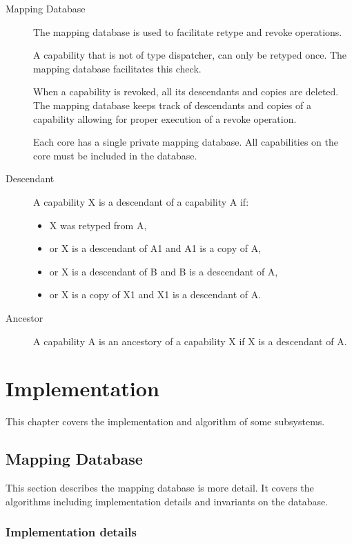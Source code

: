 \documentclass[a4paper,11pt,twoside]{report}
\begin{document}
\begin{description}
\item[Mapping Database] The mapping database is used to facilitate
  retype and revoke operations.

  A capability that is not of type dispatcher, can only be retyped once.
  The mapping database facilitates this check.

  When a capability is revoked, all its descendants and copies are deleted.
  The mapping database keeps track of descendants and copies of a capability
  allowing for proper execution of a revoke operation.

  Each core has a single private mapping database.
  All capabilities on the core must be included in the database.

\item[Descendant] A capability X is a descendant of a capability A if:

\begin{itemize}
  \item X was retyped from A,
  \item or X is a descendant of A1 and A1 is a copy of A,
  \item or X is a descendant of B and B is a descendant of A,
  \item or X is a copy of X1 and X1 is a descendant of A.
\end{itemize}

\item[Ancestor] A capability A is an ancestory of a capability X
if X is a descendant of A.
\end{description}

\chapter{Implementation}

This chapter covers the implementation and algorithm of some subsystems.

\section{Mapping Database}

This section describes the mapping database is more detail.
It covers the algorithms including implementation details
and invariants on the database.

\subsection{Implementation details}
\end{document}
